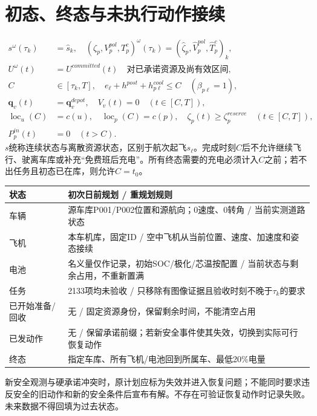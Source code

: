 \section{初态、终态与未执行动作接续}
\begin{align}
 s^\omega(\tau_k)&=\widehat s_k,\quad
 (\zeta_p,V_p^{pol},T_p^c)^\omega(\tau_k)=(\widehat\zeta_p,\widehat V_p^{pol},\widehat T_p^c)_k,\label{eng:eq:initialstate}\\
 U^\omega(t)&=U^{committed}(t)\quad\text{对已承诺资源及尚有效区间},\label{eng:eq:commitment}\\
 C&\in[\tau_k,T],\quad e_\ell+h^{post}+h_{p\ell}^{cool}\le C\quad(\beta_{p\ell}=1),\\
 \mathbf q_v(t)&=\mathbf q_v^{depot},\quad V_v(t)=0\quad(t\in[C,T]),\\
 \operatorname{loc}_u(C)&=c(u),\quad\operatorname{loc}_p(C)=c(p),\quad
 \zeta_p(t)\ge\zeta_p^{reserve}\quad(t\in[C,T]),\label{eng:eq:terminal}\\
 P_p^{in}(t)&=0\quad(t>C).
\end{align}
\noindent $s$统称连续状态与离散资源状态，区别于航次起飞$s_\ell$。完成时刻$C$后不允许继续飞行、驶离车库或补充“免费班后充电”。所有终态需要的充电必须计入$C$之前；若不出任务且初态已在库，则允许$C=t_0$。
\begin{center}\small
\begin{tabular}{p{.25\linewidth}p{.65\linewidth}}\toprule
状态 & 初次日前规划 / 重规划规则\\\midrule
车辆 & 源车库P001/P002位置和源航向；0速度、0转角 / 当前实测道路状态\\
飞机 & 本车机库，固定ID / 空中飞机从当前位置、速度、加速度和姿态接续\\
电池 & 名义量仅作记录，初始SOC/极化/芯温按配置 / 当前状态与剩余占用，不重新置满\\
任务 & 2133项均未验收 / 只移除有图像证据且验收时刻不晚于$\tau_k$的要求\\
已开始准备/回收 & 无 / 固定资源身份，保留剩余时间，不能清空占用\\
已发动作 & 无 / 保留承诺前缀；若新安全事件使其失效，切换到实际可行恢复动作\\
终态 & 指定车库、所有飞机/电池回到所属车、最低20\%电量\\\bottomrule
\end{tabular}\end{center}
\noindent 新安全观测与硬承诺冲突时，原计划应标为失效并进入恢复问题；不能同时要求违反安全的旧动作和新的安全条件后宣布有解。不存在可验证恢复动作时记录失败。未来数据不得回填为过去状态。
\clearpage


